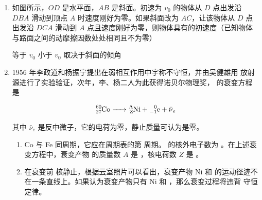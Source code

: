 \documentclass[\gkver]{gaokaozhenti}
\begin{document}
\begin{enumerate}

\item
如图所示，$OD$ 是水平面，$AB$ 是斜面。初速为 $v_{0}$ 的物体从 $D$ 点出发沿 $DBA$ 滑动到顶点 $A$ 时速度刚好为零。如果斜面改为 $AC$，让该物体从 $D$ 点出发沿 $DCA$ 滑动到 $A$ 点且速度刚好为零，则物体具有的初速度（已知物体与路面之间的动摩擦因数处处相同且不为零）

{等于 $v_{0}$}
{小于 $v_{0}$}
{取决于斜面的倾角}


\item
1956 年李政道和杨振宁提出在弱相互作用中宇称不守恒，并由吴健雄用  放射源进行了实验验证，次年，李、杨二人为此获得诺贝尔物理奖， 的衰变方程是

\[ \ce{^{60}_{27}Co -> ^{A}_{Z}Ni + ^{0}_{-1}e + \bar{\nu}_{e}} \]

其中 $\bar{\nu}_{e}$ 是反中微子，它的电荷为零，静止质量可认为是零。

\begin{enumerate}
	\item
	Co 与 Fe 同周期，它应在周期表的第  周期。 的核外电子数为 。在上述衰变方程中，衰变产物  的质量数 $A$ 是 ，核电荷数 $Z$ 是 。
	
	\item
	在衰变前  核静止，根据云室照片可以看出，衰变产物 Ni 和  的运动径迹不在一条直线上。如果认为衰变产物只有 Ni 和 ，那么衰变过程将违背  守恒定律。
	

\end{enumerate}
\end{enumerate}
\end{document}
